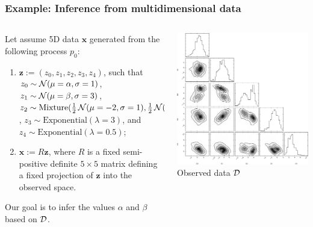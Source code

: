 \documentclass{beamer}
\begin{document}
\begin{frame}
    \frametitle{Example: Inference from multidimensional data}

\begin{columns}
    \begin{column}{0.55\textwidth}
       Let assume 5D data $\mathbf{x}$ generated
       from the following process $p_0$:

            {\scriptsize
           \begin{enumerate}
               \item $\mathbf{z} := (z_0, z_1, z_2, z_3, z_4)$, such that
                   $z_0 \sim {\cal N}(\mu=\alpha, \sigma=1)$,
                   $z_1 \sim {\cal N}(\mu=\beta, \sigma=3)$,
                   $z_2 \sim {\text{Mixture}}(\frac{1}{2}\,{\cal N}(\mu=-2, \sigma=1), \frac{1}{2}\,{\cal N}(\mu=2, \sigma=0.5))$,
                   $z_3 \sim {\text{Exponential}(\lambda=3)}$, and
                   $z_4 \sim {\text{Exponential}(\lambda=0.5)}$;
               \item $\mathbf{x} := R  \mathbf{z}$, where $R$ is a fixed
               semi-positive definite $5 \times 5$ matrix defining a fixed projection
               of $\mathbf{z}$ into the observed space.
           \end{enumerate}}

        Our goal is to infer the values $\alpha$ and $\beta$ based on ${\cal D}$.
    \end{column}
    \begin{column}{0.4\textwidth}
        \centering
        \includegraphics[width=\textwidth]{figures/fig4.pdf}\\
        Observed data ${\cal D}$
    \end{column}
\end{columns}


\end{frame}
\end{document}
